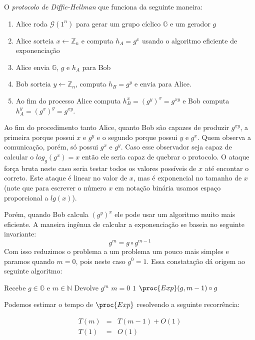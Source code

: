 O {\em protocolo de Diffie-Hellman} que funciona da seguinte maneira:
\begin{enumerate}
\item Alice roda $\mathcal{G}(1^n)$ para gerar um grupo cíclico $\mathbb{G}$ e um gerador $g$
\item Alice sorteia $x \leftarrow \mathbb{Z}_n$ e computa $h_A = g^x$ usando o algoritmo eficiente de exponenciação
\item Alice envia $\mathbb{G}$, $g$ e $h_A$ para Bob
\item Bob sorteia $y \leftarrow \mathbb{Z}_n$, computa $h_B = g^y$ e envia para Alice.
\item Ao fim do processo Alice computa $h_B^x = (g^y)^x = g^{xy}$ e Bob computa $h_A^y = (g^x)^y = g^{xy}$.
\end{enumerate}

Ao fim do procedimento tanto Alice, quanto Bob são capazes de produzir $g^{xy}$, a primeira porque possui $x$ e $g^y$ e o segundo porque possui $y$ e $g^x$.
Quem observa a comunicação, porém, só possui $g^x$ e $g^y$.
Caso esse observador seja capaz de calcular o $log_g(g^x) = x$ então ele seria capaz de quebrar o protocolo.
O ataque força bruta neste caso seria testar todos os valores possíveis de $x$ até encontar o correto.
Este ataque é linear no valor de $x$, mas é exponencial no tamanho de $x$ (note que para escrever o número $x$ em notação binária usamos espaço proporcional a $lg(x)$).

Porém, quando Bob calcula $(g^{y})^x$ ele pode usar um algoritmo muito mais eficiente.
A maneira ingênua de calcular a exponenciação se baseia no seguinte invariante:
\begin{displaymath}
  g^m = g \circ g^{m-1}
\end{displaymath}
Com isso reduzimos o problema a um problema um pouco mais simples e paramos quando $m = 0$, pois neste caso $g^0 = 1$.
Essa constatação dá origem ao seguinte algoritmo:

\begin{codebox}
\li \Comment Recebe $g \in \mathbb{G}$ e $m \in \mathbb{N}$
\li \Comment Devolve $g^m$
\li \If $m = 0 $ 
\li \Then \Return $1$
\End
\li \Return $\proc{Exp}(g, m-1) \circ g$
\End
\end{codebox}

Podemos estimar o tempo de $\proc{Exp}$ resolvendo a seguinte recorrência:

\begin{eqnarray*}
  T(m) & = & T(m - 1) + O(1)\\
  T(1) & = & O(1)
\end{eqnarray*}

